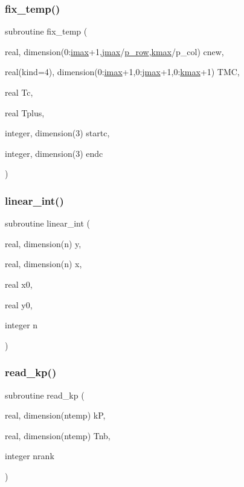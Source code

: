\subsubsection{\texorpdfstring{fix\+\_\+temp()}{fix\_temp()}}
{\footnotesize\ttfamily subroutine fix\+\_\+temp (\begin{DoxyParamCaption}\item[{real, dimension(0\+:\hyperlink{param_8h_a788916a7426baf172c67386359720d6d}{imax}+1,\hyperlink{param_8h_ac5c80d846ec0c4cf1c91fc5d9d66faa1}{jmax}/\hyperlink{param_8h_a149afb59990224def797b29467985bac}{p\+\_\+row},\hyperlink{param_8h_ae0453dd20a7c6a923904df942ef82468}{kmax}/p\+\_\+col)}]{cnew,  }\item[{real(kind=4), dimension(0\+:\hyperlink{param_8h_a788916a7426baf172c67386359720d6d}{imax}+1,0\+:\hyperlink{param_8h_ac5c80d846ec0c4cf1c91fc5d9d66faa1}{jmax}+1,0\+:\hyperlink{param_8h_ae0453dd20a7c6a923904df942ef82468}{kmax}+1)}]{T\+MC,  }\item[{real}]{Tc,  }\item[{real}]{Tplus,  }\item[{integer, dimension(3)}]{startc,  }\item[{integer, dimension(3)}]{endc }\end{DoxyParamCaption})}

\mbox{\label{fix__var_8f_a1ab3da80be3f3ec186d62448e97fb109}} 
\subsubsection{\texorpdfstring{linear\+\_\+int()}{linear\_int()}}
{\footnotesize\ttfamily subroutine linear\+\_\+int (\begin{DoxyParamCaption}\item[{real, dimension(n)}]{y,  }\item[{real, dimension(n)}]{x,  }\item[{real}]{x0,  }\item[{real}]{y0,  }\item[{integer}]{n }\end{DoxyParamCaption})}

\mbox{\label{fix__var_8f_af4aa948d8d18b1b8319b5c6abc736162}} 
\subsubsection{\texorpdfstring{read\+\_\+kp()}{read\_kp()}}
{\footnotesize\ttfamily subroutine read\+\_\+kp (\begin{DoxyParamCaption}\item[{real, dimension(ntemp)}]{kP,  }\item[{real, dimension(ntemp)}]{Tnb,  }\item[{integer}]{nrank }\end{DoxyParamCaption})}

